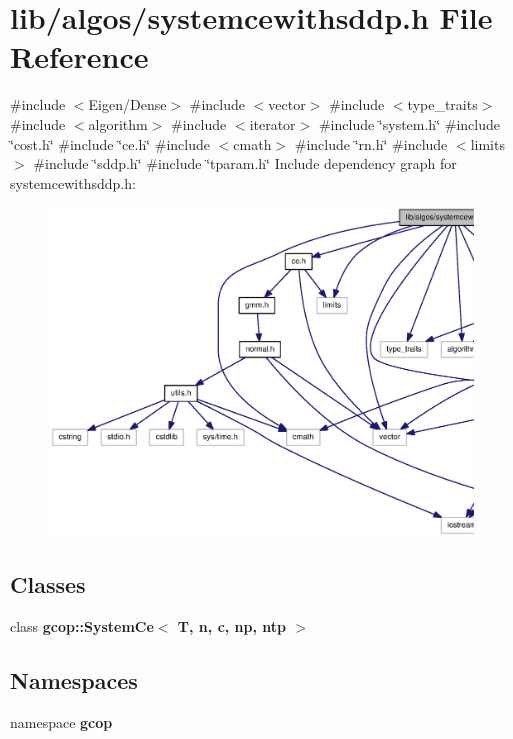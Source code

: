 \section{lib/algos/systemcewithsddp.h \-File \-Reference}
\label{systemcewithsddp_8h}
{\ttfamily \#include $<$\-Eigen/\-Dense$>$}\*
{\ttfamily \#include $<$vector$>$}\*
{\ttfamily \#include $<$type\-\_\-traits$>$}\*
{\ttfamily \#include $<$algorithm$>$}\*
{\ttfamily \#include $<$iterator$>$}\*
{\ttfamily \#include \char`\"{}system.\-h\char`\"{}}\*
{\ttfamily \#include \char`\"{}cost.\-h\char`\"{}}\*
{\ttfamily \#include \char`\"{}ce.\-h\char`\"{}}\*
{\ttfamily \#include $<$cmath$>$}\*
{\ttfamily \#include \char`\"{}rn.\-h\char`\"{}}\*
{\ttfamily \#include $<$limits$>$}\*
{\ttfamily \#include \char`\"{}sddp.\-h\char`\"{}}\*
{\ttfamily \#include \char`\"{}tparam.\-h\char`\"{}}\*
\-Include dependency graph for systemcewithsddp.\-h\-:\nopagebreak
\begin{figure}[H]
\begin{center}
\leavevmode
\includegraphics[width=350pt]{systemcewithsddp_8h__incl}
\end{center}
\end{figure}
\subsection*{\-Classes}
\begin{DoxyCompactItemize}
\item 
class {\bf gcop\-::\-System\-Ce$<$ T, n, c, np, ntp $>$}
\end{DoxyCompactItemize}
\subsection*{\-Namespaces}
\begin{DoxyCompactItemize}
\item 
namespace {\bf gcop}
\end{DoxyCompactItemize}
